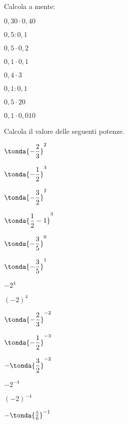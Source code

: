 
\begin{esercizio}
\label{ese:3.55}
Calcola a mente:

\begin{htmulticols}{4}
 \begin{enumeratees}
 \spazielenx
\item \(0,30\cdot0,40\)
\item \(0,5:0,1\)
\item \(0,5\cdot0,2\)
\item \(0,1\cdot0,1\)
\item \(0,4\cdot3\)
\item \(0,1:0,1\)
\item \(0,5\cdot20\)
\item \(0,1\cdot0,010\)
 \end{enumeratees}
\end{htmulticols}
\end{esercizio}


\begin{esercizio}
\label{ese:3.56}
Calcola il valore delle seguenti potenze.

\begin{htmulticols}{4}
\begin{enumeratees}
\spazielenx
 \item \(\tonda{-\dfrac{2}{3}}^2\)
 \item \(\tonda{-\dfrac{1}{2}}^3\)
 \item \(\tonda{-\dfrac{3}{2}}^2\)
 \item \(\tonda{\dfrac{1}{2}-1}^3\)
 \item \(\tonda{-\dfrac{3}{5}}^0\)
 \item \(\tonda{-\dfrac{3}{5}}^1\)
 \item \(-2^4\)
 \item \((-2)^4\)
 \item \(\tonda{-\dfrac{2}{3}}^{-2}\)
 \item \(\tonda{-\dfrac{1}{2}}^{-3}\)
 \item \(-\tonda{\dfrac{3}{2}}^{-2}\)
 \item \(-2^{-4}\)
 \item \((-2)^{-4}\)
 \item \(-\tonda{\frac{5}{6}}^{-1}\)
\end{enumeratees}
\end{htmulticols}
\end{esercizio}

